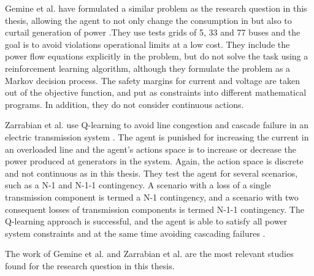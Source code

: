 \documentclass[class=book, crop=false]{standalone}
\begin{document}
Gemine et al. have formulated a similar problem as the research question in this thesis, allowing the agent to not only change the consumption in but also to curtail generation of power \cite{active_network_management}.They use tests grids of 5, 33 and 77 buses and the goal is to avoid violations operational limits at a low cost. They include the power flow equations explicitly in the problem, but do not solve the task using a reinforcement learning algorithm, although they formulate the problem as a Markov decision process. The safety margins for current and voltage are taken out of the objective function, and put as constraints into different mathematical programs. In addition, they do not consider continuous actions.

Zarrabian et al. use Q-learning to avoid line congestion and cascade failure in an electric transmission system \cite{zarrabian2016reinforcement}. The agent is punished for increasing the current in an overloaded line and the agent's actions space is to increase or decrease the power produced at generators in the system. Again, the action space is discrete and not continuous as in this thesis. They test the agent for several scenarios, such as a N-1 and N-1-1 contingency. A scenario with a loss of a single transmission component is termed a N-1 contingency, and a scenario with two consequent losses of transmission components is termed N-1-1 contingency. The Q-learning approach is successful, and the agent is able to satisfy all power system constraints and at the same time avoiding cascading failures \cite{zarrabian2016reinforcement}. 


The work of Gemine et al. and Zarrabian et al. are the most relevant studies found for the research question in this thesis. 
\end{document}
